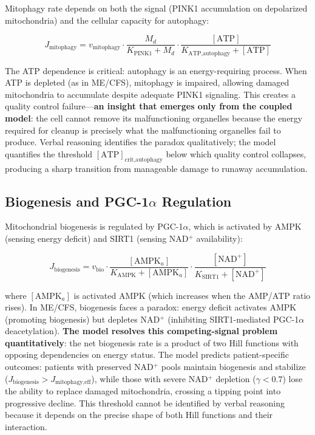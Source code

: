 Mitophagy rate depends on both the signal (PINK1 accumulation on depolarized mitochondria) and the cellular capacity for autophagy:

\begin{equation}
\label{eq:mitophagy}
J_{\text{mitophagy}} = v_{\text{mitophagy}} \cdot \frac{M_d}{K_{\text{PINK1}} + M_d} \cdot \frac{[\text{ATP}]}{K_{\text{ATP,autophagy}} + [\text{ATP}]}
\end{equation}

The ATP dependence is critical: autophagy is an energy-requiring process. When ATP is depleted (as in ME/CFS), mitophagy is impaired, allowing damaged mitochondria to accumulate despite adequate PINK1 signaling. This creates a quality control failure---\textbf{an insight that emerges only from the coupled model}: the cell cannot remove its malfunctioning organelles because the energy required for cleanup is precisely what the malfunctioning organelles fail to produce. Verbal reasoning identifies the paradox qualitatively; the model quantifies the threshold $[\text{ATP}]_{\text{crit,autophagy}}$ below which quality control collapses, producing a sharp transition from manageable damage to runaway accumulation.

\subsection{Biogenesis and PGC-1$\alpha$ Regulation}

Mitochondrial biogenesis is regulated by PGC-1$\alpha$, which is activated by AMPK (sensing energy deficit) and SIRT1 (sensing NAD$^+$ availability):

\begin{equation}
\label{eq:biogenesis}
J_{\text{biogenesis}} = v_{\text{bio}} \cdot \frac{[\text{AMPK}_a]}{K_{\text{AMPK}} + [\text{AMPK}_a]} \cdot \frac{[\text{NAD}^+]}{K_{\text{SIRT1}} + [\text{NAD}^+]}
\end{equation}

where $[\text{AMPK}_a]$ is activated AMPK (which increases when the AMP/ATP ratio rises). In ME/CFS, biogenesis faces a paradox: energy deficit activates AMPK (promoting biogenesis) but depletes NAD$^+$ (inhibiting SIRT1-mediated PGC-1$\alpha$ deacetylation). \textbf{The model resolves this competing-signal problem quantitatively}: the net biogenesis rate is a product of two Hill functions with opposing dependencies on energy status. The model predicts patient-specific outcomes: patients with preserved NAD$^+$ pools maintain biogenesis and stabilize ($J_{\text{biogenesis}} > J_{\text{mitophagy,eff}}$), while those with severe NAD$^+$ depletion ($\gamma < 0.7$) lose the ability to replace damaged mitochondria, crossing a tipping point into progressive decline. This threshold cannot be identified by verbal reasoning because it depends on the precise shape of both Hill functions and their interaction.

